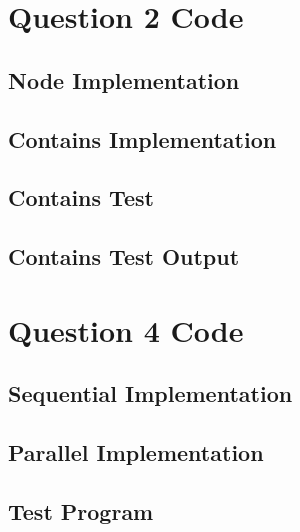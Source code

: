 \documentclass[11pt]{article}
\begin{document}
\appendix
\section{Question 2 Code}
\subsection{Node Implementation}

\subsection{Contains Implementation}

\subsection{Contains Test}

\subsection{Contains Test Output}


\section{Question 4 Code}
\subsection{Sequential Implementation}

\subsection{Parallel Implementation}

\subsection{Test Program}

\end{document}
